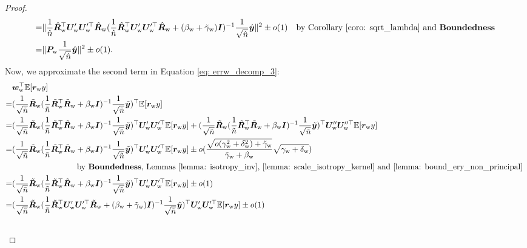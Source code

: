 \begin{proof}
\begin{align}
   \nonumber
   = & \| \frac{1}{\hat{n}}\hat{{\bm{R}}}_{\text{w}}^\top {\bm{U}}_{\text{w}}'{\bm{U}}_{\text{w}}'^\top \hat{{\bm{R}}}_{\text{w}}(\frac{1}{\hat{n}}\hat{{\bm{R}}}_{\text{w}}^\top {\bm{U}}_{\text{w}}'{\bm{U}}_{\text{w}}'^\top \hat{{\bm{R}}}_{\text{w}} + (\beta_{\text{w}}+\tilde{\gamma}_{\text{w}}){\bm{I}} )^{-1} \frac{1}{\sqrt{\hat{n}}}\hat{{\bm{y}}} \|^2 \pm o(1)\quad\text{by Corollary \ref{coro: sqrt_lambda} and \textbf{Boundedness}{}}\\
   \label{eq: wsigma_term_1}
   = & \| {\bm{P}}_{\text{w}} \frac{1}{\sqrt{\hat{n}}}\hat{{\bm{y}}} \|^2 \pm o(1).
\end{align}
Now, we approximate the second term in Equation \ref{eq: errw_decomp_3}:
\begin{align}
    \nonumber
    &\vw_\w^\top \E[\vr_\w y]\\
    \nonumber
    =& (\frac{1}{\sqrt{\tilde{n}}}\tilde{\mR}_\w (\frac{1}{\tilde{n}}\tilde{\mR}_\w^\top \tilde{\mR}_\w + \beta_\w\mI )^{-1}\frac{1}{\sqrt{\tilde{n}}}\tilde{\vy})^\top \E[\vr_\w y] \\
    \nonumber
    = & (\frac{1}{\sqrt{\tilde{n}}}\tilde{\mR}_\w (\frac{1}{\tilde{n}}\tilde{\mR}_\w^\top \tilde{\mR}_\w + \beta_\w\mI )^{-1}\frac{1}{\sqrt{\tilde{n}}}\tilde{\vy})^\top \mU_\w'\mU_\w'^\top \E[\vr_\w y] + (\frac{1}{\sqrt{\tilde{n}}}\tilde{\mR}_\w (\frac{1}{\tilde{n}}\tilde{\mR}_\w^\top \tilde{\mR}_\w + \beta_\w\mI )^{-1}\frac{1}{\sqrt{\tilde{n}}}\tilde{\vy})^\top \mU_\w''\mU_\w''^\top \E[\vr_\w y] \\
    \nonumber
    = & (\frac{1}{\sqrt{\tilde{n}}}\tilde{\mR}_\w (\frac{1}{\tilde{n}}\tilde{\mR}_\w^\top \tilde{\mR}_\w + \beta_\w\mI )^{-1}\frac{1}{\sqrt{\tilde{n}}}\tilde{\vy})^\top \mU_\w'\mU_\w'^\top \E[\vr_\w y] \pm o( \frac{\sqrt{o(\gamma_\w^2+\delta_\w^2)+\tilde{\gamma}_\w}}{\tilde{\gamma}_\w+\beta_\w}\sqrt{\gamma_\w+\delta_\w} )\\
    \nonumber
    & \quad\quad\quad\quad\quad\quad\quad\quad\text{by \bounded{}, Lemmas \ref{lemma: isotropy_inv}, \ref{lemma: scale_isotropy_kernel} and \ref{lemma: bound_ery_non_principal} }\\
    \nonumber
    = & (\frac{1}{\sqrt{\tilde{n}}}\tilde{\mR}_\w (\frac{1}{\tilde{n}}\tilde{\mR}_\w^\top \tilde{\mR}_\w + \beta_\w\mI )^{-1}\frac{1}{\sqrt{\tilde{n}}}\tilde{\vy})^\top \mU_\w'\mU_\w'^\top \E[\vr_\w y] \pm o(1) \\
    \nonumber
    = & (\frac{1}{\sqrt{\tilde{n}}}\tilde{\mR}_\w (\frac{1}{\tilde{n}}\tilde{\mR}_\w^\top \mU_\w'\mU_\w'^\top \tilde{\mR}_\w + (\beta_\w+\tilde{\gamma}_\w)\mI )^{-1}\frac{1}{\sqrt{\tilde{n}}}\tilde{\vy})^\top \mU_\w'\mU_\w'^\top \E[\vr_\w y] \pm o(1)\\
    \nonumber

\end{align}
\end{proof}
